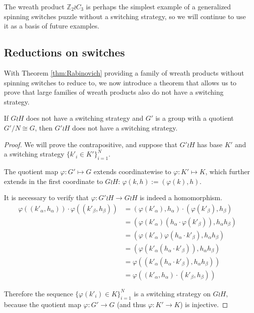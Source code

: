 The wreath product $\mathbb Z_2 \wr C_3$ is perhaps the simplest example of a
generalized spinning switches puzzle without a switching strategy,
so we will continue to use it as a basis of future examples.

\subsection{Reductions on switches}
With Theorem \ref{thm:Rabinovich} providing a family of wreath products without
spinning switches to reduce to, we now introduce a theorem that allows us to
prove that large families of wreath products also do not have a switching
strategy.
\begin{theorem}
  If $G \wr H$ does not have a switching strategy and $G'$ is a group with
  a quotient $G'/N \cong G$, then ${G'} \wr H$ does not have a switching
  strategy.
  \label{thm:SwitchReduction}
\end{theorem}
\begin{proof}
  We will prove the contrapositive, and suppose that $G' \wr H$ has base $K'$
  and a switching strategy $\{k'_i \in K'\}_{i=1}^N$.

  The quotient map
  $\varphi\colon G' \mapsto G$
  extends coordinatewise to
  $\varphi \colon K' \mapsto K$,
  which further extends in the first coordinate to $G \wr H$:
  $\varphi(k,h) := (\varphi(k), h)$.

  It is necessary to verify that $\varphi\colon G' \wr H \rightarrow G \wr H$
  is indeed a homomorphism.
  \begin{align*}
    \varphi((k'_\alpha, h_\alpha)) \cdot \varphi((k'_\beta, h_\beta))
    &= (\varphi(k'_\alpha), h_\alpha) \cdot (\varphi(k'_\beta), h_\beta) \\
    &= (\varphi(k'_\alpha)(h_\alpha\cdot\varphi(k'_\beta)), h_\alpha h_\beta) \\
    &= (\varphi(k'_\alpha)\varphi(h_\alpha\cdot k'_\beta), h_\alpha h_\beta) \\
    &= (\varphi(k'_\alpha(h_\alpha\cdot k'_\beta)), h_\alpha h_\beta) \\
    &= \varphi((k'_\alpha(h_\alpha\cdot k'_\beta), h_\alpha h_\beta)) \\
    &= \varphi((k'_\alpha, h_\alpha) \cdot (k'_\beta, h_\beta))
  \end{align*}

  Therefore the sequence $\{\varphi(k'_i) \in K\}_{i=1}^N$ is a
  switching strategy on $G \wr H$, because the quotient map
  $\varphi \colon G' \rightarrow G$
  (and thus $\varphi \colon K' \rightarrow K$)
  is injective.
\end{proof}
